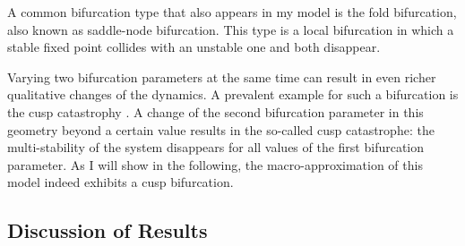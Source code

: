 A common bifurcation type that also appears in my model is the fold bifurcation, also known as saddle-node bifurcation. This type is a local bifurcation in which a stable fixed point collides with an unstable one and both disappear.

Varying two bifurcation parameters at the same time can result in even richer qualitative changes of the dynamics. A prevalent example for such a bifurcation is the cusp catastrophy \citep[][p.\.397]{Kuznetsov1998}. A change of the second bifurcation parameter in this geometry beyond a certain value results in the so-called cusp catastrophe: the multi-stability of the system disappears for all values of the first bifurcation parameter. As I will show in the following, the macro-approximation of this model indeed exhibits a cusp bifurcation. 

\subsection{Discussion of Results}

